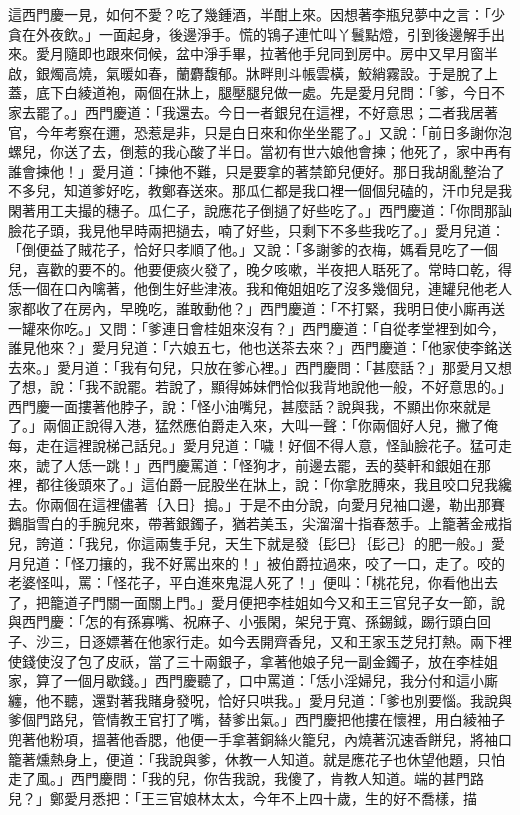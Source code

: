這西門慶一見，如何不愛？吃了幾鍾酒，半酣上來。因想著李瓶兒夢中之言：「少貪在外夜飲。」一面起身，後邊淨手。慌的鴇子連忙叫丫鬟點燈，引到後邊解手出來。愛月隨即也跟來伺候，盆中淨手畢，拉著他手兒同到房中。房中又早月窗半啟，銀燭高燒，氣暖如春，蘭麝馥郁。牀畔則斗帳雲橫，鮫綃霧設。于是脫了上蓋，底下白綾道袍，兩個在牀上，腿壓腿兒做一處。先是愛月兒問：「爹，今日不家去罷了。」西門慶道：「我還去。今日一者銀兒在這裡，不好意思；二者我居著官，今年考察在邇，恐惹是非，只是白日來和你坐坐罷了。」又說：「前日多謝你泡螺兒，你送了去，倒惹的我心酸了半日。當初有世六娘他會揀；他死了，家中再有誰會揀他！」愛月道：「揀他不難，只是要拿的著禁節兒便好。那日我胡亂整治了不多兒，知道爹好吃，教鄭春送來。那瓜仁都是我口裡一個個兒磕的，汗巾兒是我閑著用工夫撮的穗子。瓜仁子，說應花子倒撾了好些吃了。」西門慶道：「你問那訕臉花子頭，我見他早時兩把撾去，喃了好些，只剩下不多些我吃了。」愛月兒道：「倒便益了賊花子，恰好只孝順了他。」又說：「多謝爹的衣梅，媽看見吃了一個兒，喜歡的要不的。他要便痰火發了，晚夕咳嗽，半夜把人聒死了。常時口乾，得恁一個在口內噙著，他倒生好些津液。我和俺姐姐吃了沒多幾個兒，連罐兒他老人家都收了在房內，早晚吃，誰敢動他？」西門慶道：「不打緊，我明日使小廝再送一罐來你吃。」又問：「爹連日會桂姐來沒有？」西門慶道：「自從孝堂裡到如今，誰見他來？」愛月兒道：「六娘五七，他也送茶去來？」西門慶道：「他家使李銘送去來。」愛月道：「我有句兒，只放在爹心裡。」西門慶問：「甚麼話？」那愛月又想了想，說：「我不說罷。若說了，顯得姊妹們恰似我背地說他一般，不好意思的。」西門慶一面摟著他脖子，說：「怪小油嘴兒，甚麼話？說與我，不顯出你來就是了。」兩個正說得入港，猛然應伯爵走入來，大叫一聲：「你兩個好人兒，撇了俺每，走在這裡說梯己話兒。」愛月兒道：「噦！好個不得人意，怪訕臉花子。猛可走來，諕了人恁一跳！」西門慶罵道：「怪狗才，前邊去罷，丟的葵軒和銀姐在那裡，都往後頭來了。」這伯爵一屁股坐在牀上，說：「你拿肐膊來，我且咬口兒我纔去。你兩個在這裡儘著｛入日｝搗。」于是不由分說，向愛月兒袖口邊，勒出那賽鵝脂雪白的手腕兒來，帶著銀鐲子，猶若美玉，尖溜溜十指春葱手。上籠著金戒指兒，誇道：「我兒，你這兩隻手兒，天生下就是發｛髟巳｝｛髟己｝的肥一般。」愛月兒道：「怪刀攘的，我不好罵出來的！」被伯爵拉過來，咬了一口，走了。咬的老婆怪叫，罵：「怪花子，平白進來鬼混人死了！」便叫：「桃花兒，你看他出去了，把籠道子門關一面關上門。」愛月便把李桂姐如今又和王三官兒子女一節，說與西門慶：「怎的有孫寡嘴、祝麻子、小張閑，架兒于寬、孫錫鉞，踢行頭白回子、沙三，日逐嫖著在他家行走。如今丟開齊香兒，又和王家玉芝兒打熱。兩下裡使錢使沒了包了皮祅，當了三十兩銀子，拿著他娘子兒一副金鐲子，放在李桂姐家，算了一個月歇錢。」西門慶聽了，口中罵道：「恁小淫婦兒，我分付和這小廝纏，他不聽，還對著我賭身發呪，恰好只哄我。」愛月兒道：「爹也別要惱。我說與爹個門路兒，管情教王官打了嘴，替爹出氣。」西門慶把他摟在懷裡，用白綾袖子兜著他粉項，搵著他香腮，他便一手拿著銅絲火籠兒，內燒著沉速香餅兒，將袖口籠著燻熱身上，便道：「我說與爹，休教一人知道。就是應花子也休望他題，只怕走了風。」西門慶問：「我的兒，你告我說，我傻了，肯教人知道。端的甚門路兒？」鄭愛月悉把：「王三官娘林太太，今年不上四十歲，生的好不喬樣，描